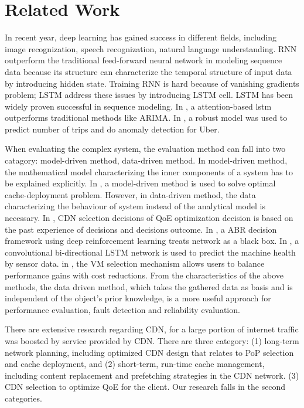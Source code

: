 \documentclass[5p]{elsarticle}
\begin{document}
\section{Related Work}
In recent year, deep learning has gained success in different fields, including image recognization, speech recognization, natural language understanding\cite{Lecun2015}. RNN\cite{Schmidhuber1989} outperform the traditional feed-forward neural network in modeling sequence data because its structure can characterize the temporal structure of input data by introducing hidden state. Training RNN is hard because of vanishing gradients problem; LSTM address these issues by introducing LSTM cell\cite{Hochreiter1997LongMemory}. LSTM has been widely proven successful in sequence modeling. In \cite{Qin}, a attention-based lstm outperforms traditional methods like ARIMA. In \cite{Zhu2017DeepUber}, a robust model was used to predict number of trips and do anomaly detection for Uber. 

When evaluating the complex system, the evaluation method can fall into two catagory: model-driven method, data-driven method. In model-driven method, the mathematical model characterizing the inner components of a system has to be explained explicitly. In \cite{Tang2017RethinkingDemands}, a model-driven method is used to solve optimal cache-deployment problem. However, in data-driven method, the data characterizing the behaviour of system instead of the analytical model is necessary. In \cite{Jiang2017Pytheas:Exploration-Exploitation}, CDN selection decisions of QoE optimization decision is based on the past experience of decisions and decisions outcome. In \cite{Mao2017NeuralPensieve}, a ABR decision framework using deep reinforcement learning treats network as a black box. In \cite{Zhao2017LearningNetworks}, a convolutional bi-directional LSTM network is used to predict the machine health by sensor data. in \cite{Yadwadkar2017SelectingClouds}, the VM selection mechanism allows users to balance performance gains with cost reductions. From the characteristics of the above methods, the data driven method, which takes the gathered data as basis and is independent of the object’s prior knowledge, is a more useful approach for performance evaluation, fault detection and reliability evaluation.

There are extensive research regarding CDN, for a large portion of internet traffic was boosted by service provided by CDN. There are three category: (1) long-term network planning, including optimized CDN design that relates to PoP selection and cache deployment\cite{Krishnan2000}\cite{Hasan2014}\cite{Tang2017RethinkingDemands}, and (2) short-term, run-time cache management, including content replacement and prefetching strategies in the CDN network\cite{Borst2010}\cite{Leconte2016}\cite{Applegate2016}. (3) CDN selection to optimize QoE for the client\cite{Jiang2017Pytheas:Exploration-Exploitation}\cite{JiangCFA:Optimization}. Our research falls in the second categories.
\end{document}
